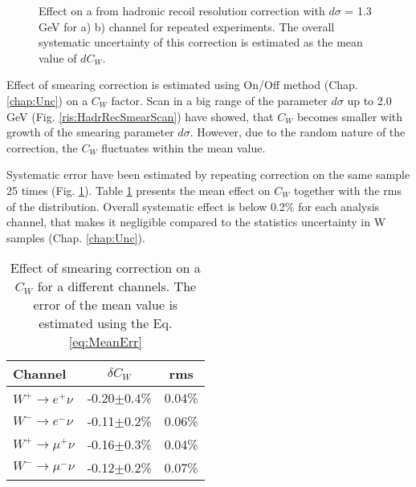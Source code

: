 \begin{figure}[!tbp]
\begin{minipage}[h]{0.49\linewidth}
\end{minipage}
\hfill
\begin{minipage}[h]{0.49\linewidth}
\end{minipage}
\caption{Effect on a \cw from hadronic recoil resolution correction with $d\sigma$ = 1.3 GeV for a) \wenu b) \wmunu channel for repeated experiments. The overall systematic uncertainty of this correction is estimated as the mean value of $dC_{W}$. }
\label{ris:HadrRecSmearStab}
\end{figure}

Effect of smearing correction is estimated using On/Off method (Chap. \ref{chap:Unc}) on a $C_{W}$ factor. Scan in a big range of the  parameter $d\sigma$ up to  2.0 GeV (Fig. \ref{ris:HadrRecSmearScan}) have showed, that $C_{W}$ becomes smaller with growth of the smearing parameter $d\sigma$. However, due to the random nature of the correction, the $C_{W}$ fluctuates within the mean value.

Systematic error have been estimated by repeating correction on the same sample 25 times (Fig. \ref{ris:HadrRecSmearStab}). Table \ref{SmearCW} presents the mean effect on $C_{W}$ together with the rms of the distribution. Overall systematic effect is below 0.2\% for each analysis channel, that makes it negligible compared to the statistics uncertainty in W samples (Chap. \ref{chap:Unc}).


 \begin{table}[!t]
 \caption{Effect of smearing correction on a $C_{W}$ for a different channels. The error of the mean value is estimated using the Eq. \ref{eq:MeanErr}}
\label{SmearCW}
\begin{center}
\begin{tabular}{| l  | c | c | }
\hline
Channel & $\delta C_W$ & rms \\
\hline
\hline
$W^{+} \to e^{+}\nu$ & -0.20$\pm0.4$\% & 0.04\% \\
$W^{-} \to e^{-}\nu$ & -0.11$\pm0.2$\% &  0.06\% \\
\hline
$W^{+} \to \mu^{+}\nu$ & -0.16$\pm0.3$\% & 0.04\% \\
$W^{-} \to \mu^{-}\nu$ & -0.12$\pm0.2$\% & 0.07\% \\
\hline
\end{tabular}
\end{center}

\end{table}

